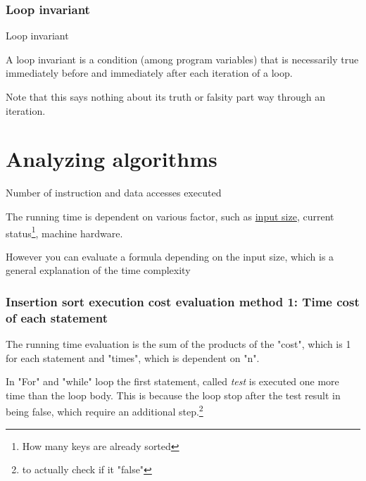 \subsubsection{Loop invariant}

\begin{definition*}
Loop invariant
\begin{definition}\label{def:loop_invariants_1}
    A loop invariant is a condition (among program variables) that is necessarily true immediately before and immediately after each iteration of a loop. 
\end{definition}
\begin{note}\label{note:loop_invariant_iteration_boolean_state_1}
    Note that this says nothing about its truth or falsity part way through an iteration.
\end{note}

\end{definition*}


\section{Analyzing algorithms}

\begin{definition}\label{def:running_time_1}
    Number of instruction and data accesses executed
\end{definition}

\begin{note}\label{note:running_time_1}
The running time is dependent on various factor, such as \hyperref[def:constant_factor_2]{input size}, current status\footnote{How many keys are already sorted}, machine hardware.

However you can evaluate a formula depending on the input size, which is a general explanation of the time complexity

\end{note}


\subsubsection{Insertion sort execution cost evaluation method 1: Time cost of each statement}

\begin{note}\label{note:statement_execution_number_1}
    The running time evaluation is the sum of the products of the "cost", which is 1 for each statement and "times", which is dependent on "n".
    
    \begin{remark}
         In "For" and "while" loop the first statement, called \emph{test} is executed one more time than the loop body.
        This is because the loop stop after the test result in being false, which require an additional step.\footnote{to actually check if it "false"}
    \end{remark}
\end{note}

